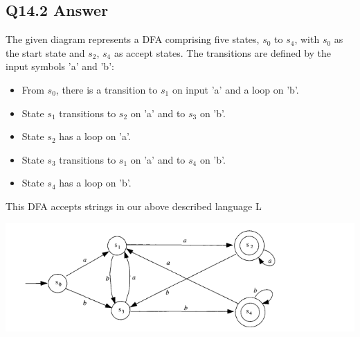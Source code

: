 \documentclass{article}
\begin{document}
\subsection*{Q14.2 Answer}
The given diagram represents a DFA comprising five states, \( s_0 \) to \( s_4 \), with \( s_0 \) as the start state and \( s_2 \), \( s_4 \) as accept states. The transitions are defined by the input symbols 'a' and 'b':
\begin{itemize}
    \item From \( s_0 \), there is a transition to \( s_1 \) on input 'a' and a loop on 'b'.
    \item State \( s_1 \) transitions to \( s_2 \) on 'a' and to \( s_3 \) on 'b'.
    \item State \( s_2 \) has a loop on 'a'.
    \item State \( s_3 \) transitions to \( s_1 \) on 'a' and to \( s_4 \) on 'b'.
    \item State \( s_4 \) has a loop on 'b'.
\end{itemize}
This DFA accepts strings in our above described language L
\begin{center}
    \includegraphics[width=15cm]{1.png}
\end{center}
\newpage
\end{document}
